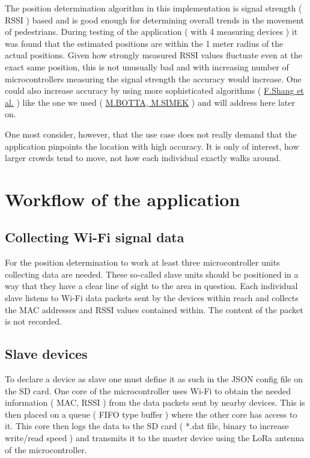\documentclass[11pt,a4paper]{article}
\begin{document}
The position determination algorithm in this implementation is signal strength ( RSSI ) based \cite{BottaSimek} and is good enough for determining overall trends in the movement of pedestrians. During testing of the application ( with 4 measuring devices ) it was found that the estimated positions are within the 1 meter radius of the actual positions. Given how strongly measured RSSI values fluctuate even at the exact same position, this is not unusually bad and with increasing number of microcontrollers measuring the signal strength the accuracy would increase. One could also increase accuracy by using more sophisticated algorithms ( \href{https://journals.sagepub.com/doi/full/10.1155/2014/371350}{F.Shang et al.} \cite{Shang} ) like the one we used ( \href{https://core.ac.uk/download/pdf/30312076.pdf}{M.BOTTA, M.SIMEK} \cite{BottaSimek} ) and will address here later on.

One most consider, however, that the use case does not really demand that the application pinpoints the location with high accuracy. It is only of interest, how larger crowds tend to move, not how each individual exactly walks around.


\newpage

\twocolumn
\section{Workflow of the application}

\subsection{Collecting Wi-Fi signal data}
For the position determination to work at least three microcontroller units collecting data are needed. These so-called slave units should be positioned in a way that they have a clear line of sight to the area in question. Each individual slave listens to Wi-Fi data packets sent by the devices within reach and collects the MAC addresses and RSSI values contained within. The content of the packet is not recorded.

\subsection{Slave devices}
To declare a device as slave one must define it as such in the JSON config file on the SD card. One core of the microcontroller uses Wi-Fi to obtain the needed information ( MAC, RSSI ) from the data packets sent by nearby devices. This is then placed on a queue ( FIFO type buffer ) where the other core has access to it. This core then logs the data to the SD card ( *.dat file, binary to increase write/read speed ) and transmits it to the master device using the LoRa antenna of the microcontroller.
\end{document}
